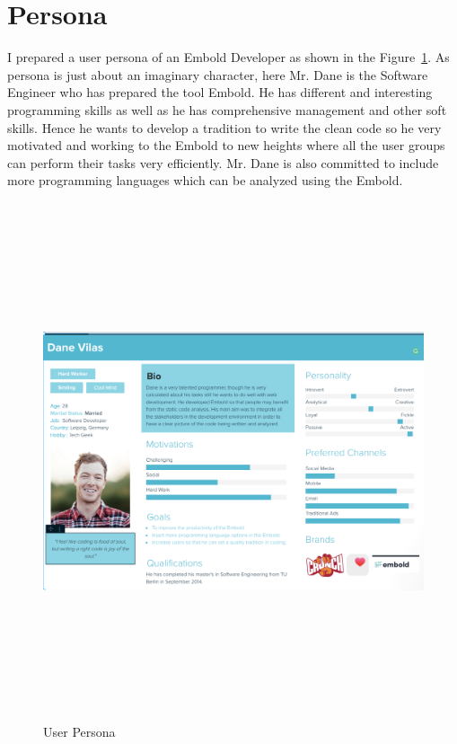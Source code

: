 \section{Persona}
I prepared a user persona of an Embold Developer as shown in the Figure~\ref{fig:User Persona}. As persona is just about an imaginary character, here Mr. Dane is the Software Engineer who has prepared the tool Embold. He has different and interesting programming skills as well as he has  comprehensive management and other soft skills. Hence he wants to develop a tradition to write the clean code so he very motivated and working to the Embold to new heights where all the user groups can perform their tasks very efficiently. Mr. Dane is also committed to   include more programming languages which can be analyzed using the Embold.
\begin{figure}[htbp]
\begin{center}
\includegraphics[width=6.5in, height=6in]{persona.png}
\caption{User Persona ~\cite{persona}}
\label{fig:User Persona}
\end{center}
\end{figure}